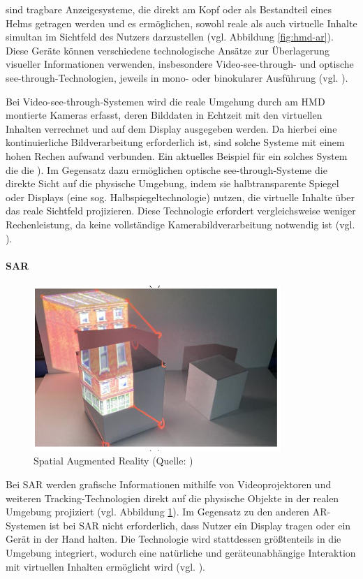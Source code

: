 sind tragbare Anzeigesysteme, die direkt am Kopf oder als Bestandteil eines Helms getragen werden und es ermöglichen, sowohl reale als auch virtuelle Inhalte simultan im Sichtfeld des Nutzers darzustellen (vgl. Abbildung \ref{fig:hmd-ar}). Diese Geräte können verschiedene technologische Ansätze zur Überlagerung visueller Informationen verwenden, insbesondere Video-see-through- und optische see-through-Technologien, jeweils in mono- oder binokularer Ausführung (vgl. \citealp[S. 346]{carmigniani_augmented_2011}).

Bei Video-see-through-Systemen wird die reale Umgehung durch am \ac{HMD} montierte Kameras erfasst, deren Bilddaten in Echtzeit mit den virtuellen Inhalten verrechnet und auf dem Display ausgegeben werden. Da hierbei eine kontinuierliche Bildverarbeitung erforderlich ist, sind solche Systeme mit einem hohen Rechen aufwand verbunden. Ein aktuelles Beispiel für ein solches System die die \cite{htc_vive_2023}). Im Gegensatz dazu ermöglichen optische see-through-Systeme die direkte Sicht auf die physische Umgebung, indem sie halbtransparente Spiegel oder Displays (eine sog. Halbspiegeltechnologie) nutzen, die virtuelle Inhalte über das reale Sichtfeld projizieren. Diese Technologie erfordert vergleichsweise weniger Rechenleistung, da keine vollständige Kamerabildverarbeitung notwendig ist (vgl. \citealp[S. 346f]{carmigniani_augmented_2011}).

\paragraph{\ac{SAR}}
\begin{figure}[ht]
\centering
\includegraphics[width=0.5\linewidth]{content/pictures/spatial-ar.PNG}
\caption{Spatial Augmented Reality (Quelle: \citealp[S. 7]{jin_bim-based_2020})}
\label{fig:spatial-ar}
\end{figure}

Bei \ac{SAR} werden grafische Informationen mithilfe von Videoprojektoren und weiteren Tracking-Technologien direkt auf die physische Objekte in der realen Umgebung projiziert (vgl. Abbildung \ref{fig:spatial-ar}). Im Gegensatz zu den anderen \ac{AR}-Systemen ist bei \ac{SAR} nicht erforderlich, dass Nutzer ein Display tragen oder ein Gerät in der Hand halten. Die Technologie wird stattdessen größtenteils in die Umgebung integriert, wodurch eine natürliche und geräteunabhängige Interaktion mit virtuellen Inhalten ermöglicht wird (vgl. \citealp[S. 348]{carmigniani_augmented_2011}).

